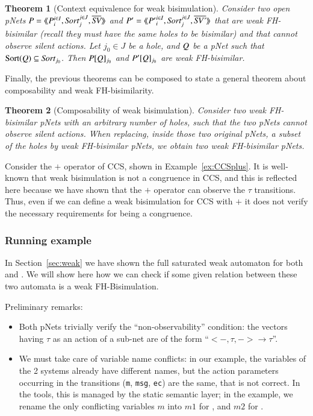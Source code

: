 \documentclass{elsarticle}
\newtheorem{thm}{Theorem}
\begin{document}
\begin{thm}[Context equivalence for  weak bisimulation]\label{weak-thm-ctxt-eq}
	Consider two  open pNets
	$\pNet = \mylangle \pNet_i^{i\in I}, \Sort_j^{j\in J}, 
	\set{\symb{SV}}\myrangle$ and 	$\pNet' = \mylangle {\pNet'}_i^{i\in I}, 
	\Sort_j^{j\in 
	J}, 	\set{\symb{SV'}}\myrangle$ that are weak FH-bisimilar
	(recall they must have the same holes to be bisimilar) and that cannot observe silent actions.
	Let $j_0\in J$ be a hole, and $Q$ be a pNet such that $\Sortop(\pNetQ)\subseteq\Sort_{j_0}$. Then 
	$P[Q]_{j_0}$ and 
	$P'[Q]_{j_0}$ are weak FH-bisimilar.
\end{thm}

Finally, the previous theorems can be composed to state a general theorem about 
composability and weak FH-bisimilarity.

\begin{thm}[Composability of weak bisimulation]\label{weak-compos}
	Consider two weak FH-bisimilar pNets with an arbitrary number of holes, such that the two pNets cannot observe silent actions. When replacing, 
	inside those two original pNets, a subset of the holes by weak FH-bisimilar pNets, we 
	obtain two weak FH-bisimilar pNets.
\end{thm}

\begin{example} Consider the $+$ operator of CCS, shown in  Example~\ref{ex:CCSplus}.  It is well-known that weak bisimulation is not a congruence in CCS, and this is reflected here because we have shown that the $+$ operator can observe the $\tau$ transitions. Thus, even if we can define a weak bisimulation for CCS with $+$ it does not verify the necessary requirements for being a congruence.
\end{example}

\subsubsection*{Running example}
\label{subsubsection:runnig example}
In Section~\ref{sec:weak} we have shown the full saturated weak automaton for both  and . We will show here how we can check if some given relation between these two automata is a weak FH-Bisimulation. 

\medskip
\noindent
Preliminary remarks:
  \begin{itemize}
    \item Both pNets trivially verify the ``non-observability''
      condition: the  vectors having $\tau$ as an action of a
      sub-net are of the form ``$< -, \tau, -> \rightarrow \tau$''.
    \item We must take care of variable name conflicts: in our example, the variables of the 2 systems already have different names, but the action parameters occurring in the transitions (\texttt{m}, \texttt{msg}, \texttt{ec}) are the same, that is not correct. In the tools, this is managed by the static semantic layer; in the  example, we rename the only conflicting variables $m$ into $m1$ for , and $m2$ for .
    \end{itemize}
\end{document}
